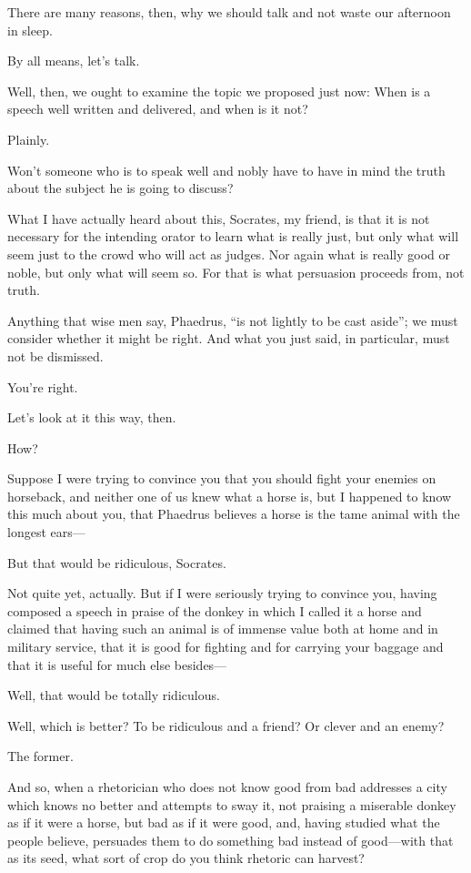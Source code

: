 There are many reasons, then, why we should talk and not waste our
afternoon in sleep.

\sayphaedrus By all means, let's talk.

\saysocrates Well, then, we ought to examine the topic we proposed
just now: When is a speech well written and delivered, and when is it
not?

\sayphaedrus Plainly.

\saysocrates Won't someone who is to speak well and nobly have to have in
mind the truth about the subject he is going to discuss?

\sayphaedrus What I have actually heard about this, Socrates, my friend, 
is that it is not necessary for the intending orator to
learn what is really just, but only what will seem just to the crowd who
will act as judges. Nor again what is really good or noble, but only
what will seem so. For that is what persuasion proceeds from, not truth.

\saysocrates Anything that wise men say, Phaedrus, “is not lightly to be
cast aside”; we must
consider whether it might be right. And what you just said, in
particular, must not be dismissed.

\sayphaedrus You're right.

\saysocrates Let's look at it this way, then.

\sayphaedrus How?

\saysocrates Suppose I were trying to convince you that you should
fight your enemies on horseback, and neither one of us knew what a horse
is, but I happened to know this much about you, that Phaedrus believes a
horse is the tame animal with the longest ears---

\sayphaedrus But that would be ridiculous, Socrates.

\saysocrates Not quite yet, actually. But if I were seriously trying to
convince you, having composed a speech in praise of the donkey in which
I called it a horse and claimed that having such an animal is of immense
value both at home and in military service, that it is good for fighting
and for carrying your baggage and that it is useful for much else
besides---

\sayphaedrus Well, that would be totally ridiculous.

\saysocrates Well, which is better? To be ridiculous and a friend? Or
clever and an enemy?

\sayphaedrus The former.

\saysocrates And so, when a rhetorician who does not know good from bad
addresses a city which knows no better and attempts to sway it, not
praising a miserable donkey as if it were a horse, but bad as if it were
good, and, having studied what the people believe, persuades them to do
something bad instead of good---with that as its seed, what sort of crop 
do you think rhetoric can harvest?

